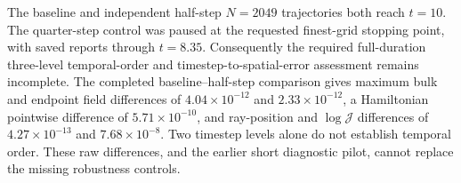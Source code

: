 The baseline and independent half-step $N=2049$ trajectories both reach $t=10$. The quarter-step control was paused at the requested finest-grid stopping point, with saved reports through $t=8.35$. Consequently the required full-duration three-level temporal-order and timestep-to-spatial-error assessment remains incomplete. The completed baseline--half-step comparison gives maximum bulk and endpoint field differences of $4.04\times10^{-12}$ and $2.33\times10^{-12}$, a Hamiltonian pointwise difference of $5.71\times10^{-10}$, and ray-position and $\log\mathcal J$ differences of $4.27\times10^{-13}$ and $7.68\times10^{-8}$. Two timestep levels alone do not establish temporal order. These raw differences, and the earlier short diagnostic pilot, cannot replace the missing robustness controls.
